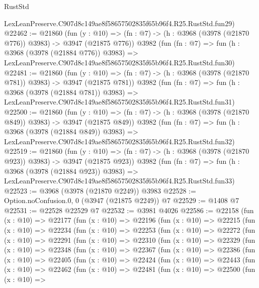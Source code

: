\begin{lexlean}{RustStd}
\begin{coremodule}
    LexLeanPreserve.C907d8c149ae8f58657502835f65b96f4.R25.RustStd.fun29)
@22462 := @21860
    (fun (y : @10) => (fn : @7) -> (h : @3968 (@3978 (@21870 @776)) @3983) -> @3947 (@21875 @776))
    @3982
    (fun (fn : @7) =>
    fun (h : @3968 (@3978 (@21884 @776)) @3983) =>
    LexLeanPreserve.C907d8c149ae8f58657502835f65b96f4.R25.RustStd.fun30)
@22481 := @21860
    (fun (y : @10) => (fn : @7) -> (h : @3968 (@3978 (@21870 @781)) @3983) -> @3947 (@21875 @781))
    @3982
    (fun (fn : @7) =>
    fun (h : @3968 (@3978 (@21884 @781)) @3983) =>
    LexLeanPreserve.C907d8c149ae8f58657502835f65b96f4.R25.RustStd.fun31)
@22500 := @21860
    (fun (y : @10) => (fn : @7) -> (h : @3968 (@3978 (@21870 @849)) @3983) -> @3947 (@21875 @849))
    @3982
    (fun (fn : @7) =>
    fun (h : @3968 (@3978 (@21884 @849)) @3983) =>
    LexLeanPreserve.C907d8c149ae8f58657502835f65b96f4.R25.RustStd.fun32)
@22519 := @21860
    (fun (y : @10) => (fn : @7) -> (h : @3968 (@3978 (@21870 @923)) @3983) -> @3947 (@21875 @923))
    @3982
    (fun (fn : @7) =>
    fun (h : @3968 (@3978 (@21884 @923)) @3983) =>
    LexLeanPreserve.C907d8c149ae8f58657502835f65b96f4.R25.RustStd.fun33)
@22523 := @3968 (@3978 (@21870 @2249)) @3983
@22528 := Option.noConfusion.{0, 0} (@3947 (@21875 @2249)) @7
@22529 := @1408 @7
@22531 := @22528 @22529 @7
@22532 := @3981 @4026
@22586 := @22158
    (fun (x : @10) =>
    @22177
      (fun (x : @10) =>
      @22196
        (fun (x : @10) =>
        @22215
          (fun (x : @10) =>
          @22234
            (fun (x : @10) =>
            @22253
              (fun (x : @10) =>
              @22272
                (fun (x : @10) =>
                @22291
                  (fun (x : @10) =>
                  @22310
                    (fun (x : @10) =>
                    @22329
                      (fun (x : @10) =>
                      @22348
                        (fun (x : @10) =>
                        @22367
                          (fun (x : @10) =>
                          @22386
                            (fun (x : @10) =>
                            @22405
                              (fun (x : @10) =>
                              @22424
                                (fun (x : @10) =>
                                @22443
                                  (fun (x : @10) =>
                                  @22462
                                    (fun (x : @10) =>
                                    @22481
                                      (fun (x : @10) =>
                                      @22500
                                        (fun (x : @10) =>

\end{coremodule}
\end{lexlean}
